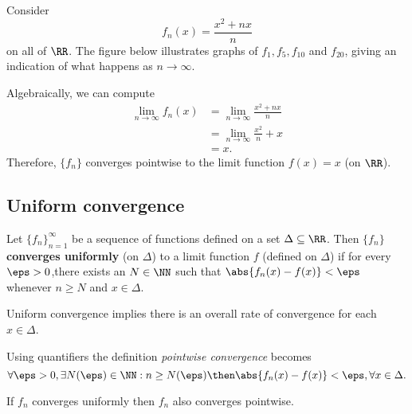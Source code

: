 \documentclass[12pt, a4paper]{article}
\begin{document}
\begin{example}
    Consider
    \[f_n(x)=\frac{x^2+nx}{n}\]
    on all of \(\RR\). The figure below illustrates graphs of \(f_1,f_5,f_{10}\) and \(f_{20}\), giving an indication of what happens as \(n \to \infty\). 
    \begin{figure}[H]
         \begin{center}
            
         \end{center}
    \end{figure}
    Algebraically, we can compute 
    \[\begin{aligned}
        \lim_{n\to \infty} f_n(x) &= \lim_{n \to \infty} \frac{x^2+nx}{n} \\
        &= \lim_{n \to \infty} \frac{x^2}{n} +x \\
        &=x.
    \end{aligned}\]
    Therefore, \(\{f_n\}\) converges pointwise to the limit function \(f(x)=x\) (on \(\RR\)).
\end{example}

\subsection{Uniform convergence}

\begin{definition}
    Let \(\{f_n\}_{n=1}^{\infty}\) be a sequence of functions defined on a set \(\Delta \subseteq \RR\). Then \(\{f_n\}\) \textbf{converges uniformly} (on \(\Delta\)) to a limit function \(f\) (defined on \(\Delta\)) if for every \(\eps>0\),there exists an \(N \in \NN\) such that \(\abs{f_n(x)-f(x)}<\eps\) whenever \(n \geq N\) and \(x \in \Delta\).
\end{definition}

\begin{mdnote}
    Uniform convergence implies there is an overall rate of convergence for each \(x \in \Delta\).
\end{mdnote}

\begin{mdremark}
    Using quantifiers the definition \textit{pointwise convergence} becomes
    \[\forall \eps>0, \exists N(\eps) \in \NN : n \geq N(\eps) \then \abs{f_n(x)-f(x)}<\eps, \forall x \in \Delta.\]
\end{mdremark}

\begin{theorem}
    If \(f_n\) converges uniformly then \(f_n\) also converges pointwise.
\end{theorem}
\end{document}
